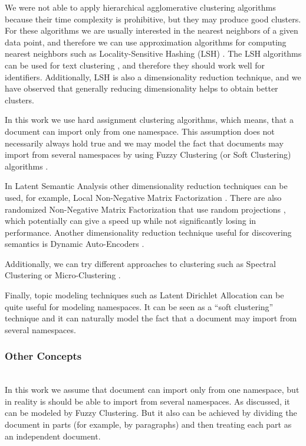 We were not able to apply hierarchical agglomerative clustering algorithms because 
their time complexity is prohibitive, but they may produce good clusters. 
For these algorithms we are usually interested in the nearest neighbors of a given 
data point, and therefore we can use approximation algorithms for computing nearest 
neighbors such as Locality-Sensitive Hashing (LSH) \cite{leskovec2014mining}.
The LSH algorithms can be used for text clustering \cite{ravichandran2005randomized},
and therefore they should work well for identifiers. Additionally, LSH is also a 
dimensionality reduction technique, and we have observed that generally 
reducing dimensionality helps to obtain better clusters. 

In this work we use hard assignment clustering algorithms, which means, that a document 
can import only from one namespace. This assumption does not necessarily always hold true 
and we may model the fact that documents may import from several namespaces by 
using Fuzzy Clustering (or Soft Clustering) algorithms \cite{baraldi1999survey}.

In Latent Semantic Analysis other dimensionality reduction techniques
can be used, for example, Local Non-Negative Matrix Factorization \cite{li2001learning}.
There are also randomized Non-Negative Matrix Factorization that use
random projections \cite{wang2010efficient} \cite{damle2014random},
which potentially can give a speed up while not significantly losing
in performance. Another dimensionality reduction technique useful for
discovering semantics is Dynamic Auto-Encoders \cite{mirowski2010dynamic}.

Additionally, we can try different approaches to clustering such as
Spectral Clustering \cite{ng2002spectral} or Micro-Clustering \cite{uno2015micro}.

Finally, topic modeling techniques such as Latent Dirichlet Allocation
\cite{blei2003latent} can be quite useful for modeling namespaces. It can be 
seen as a ``soft clustering'' technique and it can naturally model the fact that 
a document may import from several namespaces.


\subsubsection{Other Concepts}  \ \\

In this work we assume that document can import only from one namespace,
but in reality is should be able to import from several namespaces. As discussed,
it can be modeled by Fuzzy Clustering. But it also can be achieved by 
dividing the document in parts (for example, by paragraphs)
and then treating each part as an independent document.

